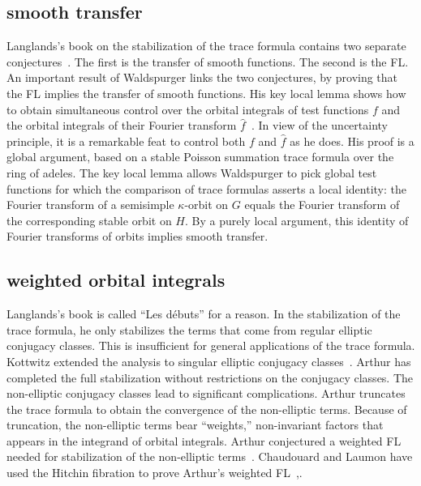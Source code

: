 \documentclass[brochure,english,12pt]{bourbaki}
\begin{document}
\subsection{smooth transfer}

Langlands's book on the stabilization of the trace formula contains
two separate conjectures~\cite{Langlands:debuts}.  The first is the transfer of smooth
functions.  The second is the FL.  An important result
of Waldspurger links the two conjectures, by proving that the
FL implies the transfer of smooth functions.  
His key local lemma shows how to obtain simultaneous control over the
orbital integrals of test functions $f$ and the orbital integrals of
their Fourier transform $\hat f$~\cite[Prop.~8.2]{Wald:transfert}.  
In view of the uncertainty principle, it is a remarkable feat to
control both $f$ and $\hat f$ as he does.
His proof is a global argument, based on a stable Poisson summation
trace formula over the ring of adeles.  The key local lemma allows
Waldspurger to pick global test functions for which the comparison of
trace formulas asserts a local identity: the Fourier transform of a
semisimple $\kappa$-orbit on $G$ equals the Fourier transform of the
corresponding stable orbit on $H$.  By a purely local argument, this
identity of Fourier transforms of orbits implies smooth transfer.


\subsection{weighted orbital integrals}

Langlands's book is called ``Les d\'ebuts'' for a reason.  In the
stabilization of the trace formula, he only stabilizes the terms that
come from regular elliptic conjugacy classes.  This is insufficient
for general applications of the trace formula.  Kottwitz extended the
analysis to singular elliptic conjugacy classes~\cite{Kott:singular}.  Arthur has
completed the full stabilization without restrictions on the conjugacy
classes.  The non-elliptic conjugacy classes lead to significant
complications.  Arthur truncates the trace formula to obtain the convergence
of the non-elliptic terms.  Because of truncation, the non-elliptic
terms bear ``weights,'' non-invariant factors that appears in the
integrand of orbital integrals.  Arthur conjectured a weighted
FL needed for stabilization of the non-elliptic
terms~\cite{Arthur:2002}.  Chaudouard and Laumon have used the
Hitchin fibration to prove Arthur's weighted FL~\cite{CL:2009:I},\cite{CL:2009:II}.
\end{document}
